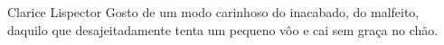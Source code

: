\thispagestyle{empty}         %
\vspace*{10 pc}

\begin{aquote}{Clarice Lispector}
Gosto de um modo carinhoso do inacabado, do malfeito, daquilo que desajeitadamente tenta
um pequeno vôo e cai sem graça no chão.
\end{aquote}


\vfill
\clearpage
